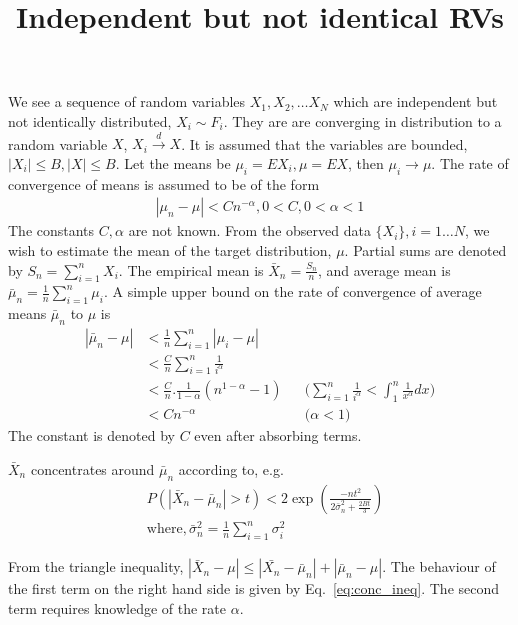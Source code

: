 \documentclass[a4paper, 11pt]{article}
\title{Independent but not identical RVs}
\author{}
\date{}
\newcommand{\empmean}{\bar{X}_n}
\newcommand{\avgmean}{\bar{\mu}_n}
\begin{document}
\maketitle

We see a sequence of random variables $X_1,X_2,\hdots X_N$ which are independent
but not identically distributed, $X_i \sim F_i$. They are are converging in
distribution to a random variable $X$, $X_i\xrightarrow{d}X$. It is assumed that
the variables are bounded, $|X_i| \leq B,|X| \leq B$. Let the means be $\mu_i =
EX_i, \mu = EX$, then $\mu_i\rightarrow \mu$. The rate of convergence of means
is assumed to be of the form
\begin{align}
  |\mu_n-\mu| < Cn^{-\alpha}, 0 < C , 0 < \alpha < 1
\end{align}
The constants $C,\alpha$ are not known. From the observed data $\{X_i\}, i =
1\dots N$, we wish to estimate the mean of the target distribution,
$\mu$. Partial sums are denoted by $S_n = \sum_{i=1}^nX_i$. The empirical mean
is $\empmean = \frac{S_n}{n}$, and average mean is $\avgmean =
\frac{1}{n}\sum_{i=1}^n\mu_i$. A simple upper bound on the rate of convergence
of average means $\avgmean$ to $\mu$ is
\begin{align}
 |\avgmean-\mu| &< \frac{1}{n}\sum_{i=1}^n|\mu_i-\mu| \nonumber \\
 &< \frac{C}{n}\sum_{i=1}^n\frac{1}{i^\alpha} \nonumber \\
 &< \frac{C}{n}.\frac{1}{1-\alpha}(n^{1-\alpha}-1) \nonumber
 &&\text{($\sum_{i=1}^n\frac{1}{i^\alpha} < \int_1^n \frac{1}{x^\alpha}dx$)}\\ 
 &< Cn^{-\alpha} &&\text{($\alpha < 1$)} \label{eq:avgmean_rate}
\end{align}
The constant is denoted by $C$ even after absorbing terms.

$\empmean$ concentrates around $\avgmean$ according to, e.g.
\begin{align} \label{eq:conc_ineq}
  &P(|\empmean-\avgmean| > t) < 2\exp 
  \left(\frac{-nt^2}{2\bar{\sigma}_n^2+\frac{2Bt}{3}}\right) \\
  &\text{where},\bar{\sigma}_n^2 = \frac{1}{n}\sum_{i=1}^n\sigma_i^2 \nonumber
\end{align}

From the triangle inequality, $|\empmean-\mu| \leq
|\bar{X_n}-\avgmean|+|\avgmean-\mu|$. The behaviour of the first term on
the right hand side is given by Eq.~\ref{eq:conc_ineq}. The second term requires
knowledge of the rate $\alpha$. 
\end{document}
